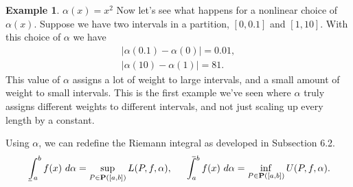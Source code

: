 \documentclass{article}
\def\upint{\mathchoice%
	{\mkern13mu\overline{\vphantom{\intop}\mkern7mu}\mkern-20mu}%
	{\mkern7mu\overline{\vphantom{\intop}\mkern7mu}\mkern-14mu}%
	{\mkern7mu\overline{\vphantom{\intop}\mkern7mu}\mkern-14mu}%
	{\mkern7mu\overline{\vphantom{\intop}\mkern7mu}\mkern-14mu}%
	\int}
\def\lowint{\mkern3mu\underline{\vphantom{\intop}\mkern7mu}\mkern-10mu\int}
\theoremstyle{definition}
\newtheorem{example}{Example}[section]
\begin{document}
\begin{example}{$ \alpha(x)=x^2 $}
 Now let's see what happens for a nonlinear choice of $ \alpha(x) $. Suppose we have two intervals in a partition, $ [0,0.1] $ and $ [1,10] $. With this choice of $ \alpha $ we have \begin{align*}
 	|\alpha(0.1)-\alpha(0)|=0.01,\\
 	|\alpha(10)-\alpha(1)|=81.
 \end{align*}
 This value of $ \alpha $ assigns a lot of weight to large intervals, and a small amount of weight to small intervals. This is the first example we've seen where $ \alpha $ truly assigns different weights to different intervals, and not just scaling up every length by a constant. 
\end{example}
 
Using $ \alpha $, we can redefine the Riemann integral as developed in Subsection 6.2.
$$\lowint_a^b f(x)\ d\alpha=\sup\limits_{P\in\textbf{P}([a,b])} L(P,f,\alpha), \ \ \ \ \upint_a^b f(x)\ d\alpha =\inf\limits_{P\in\textbf{P}([a,b])} U(P,f,\alpha). $$
\end{document}

